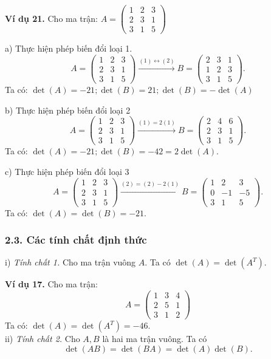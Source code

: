 \textbf{Ví dụ 21.} Cho ma trận: \(A = \begin{pmatrix}
1 & 2 & 3 \\
2 & 3 & 1 \\
3 & 1 & 5
\end{pmatrix} \)

a) Thực hiện phép biến đổi loại 1.
\[
A = \begin{pmatrix}
1 & 2 & 3 \\
2 & 3 & 1 \\
3 & 1 & 5
\end{pmatrix} \xrightarrow{(1) \leftrightarrow (2)} B = \begin{pmatrix}
2 & 3 & 1 \\
1 & 2 & 3 \\
3 & 1 & 5
\end{pmatrix}.
\]
Ta có: \(\det(A) = -21; \det(B) = 21; \det(B) = -\det(A)\)

b) Thực hiện phép biến đổi loại 2
\[
A = \begin{pmatrix}
1 & 2 & 3 \\
2 & 3 & 1 \\
3 & 1 & 5
\end{pmatrix} \xrightarrow{(1)=2(1)} B = \begin{pmatrix}
2 & 4 & 6 \\
2 & 3 & 1 \\
3 & 1 & 5
\end{pmatrix}.
\]
Ta có: \(\det(A) = -21; \det(B) = -42 = 2\det(A)\).

c) Thực hiện phép biến đổi loại 3
\[
A = \begin{pmatrix}
1 & 2 & 3 \\
2 & 3 & 1 \\
3 & 1 & 5
\end{pmatrix} \xrightarrow{(2)=(2)-2(1)} B = \begin{pmatrix}
1 & 2 & 3 \\
0 & -1 & -5 \\
3 & 1 & 5
\end{pmatrix}.
\]
Ta có: \(\det(A) = \det(B) = -21\).
\subsubsection*{2.3. Các tính chất định thức}


i) \textit{Tính chất 1.} Cho ma trận vuông \(A\). Ta có \(\det(A) = \det(A^T)\).

\textbf{Ví dụ 17.} Cho ma trận:
\[
A = \begin{pmatrix}
1 & 3 & 4 \\
2 & 5 & 1 \\
3 & 1 & 2
\end{pmatrix}
\]
Ta có: \(\det(A) = \det(A^T) = -46\).\\
ii) \textit{Tính chất 2.} Cho \(A, B\) là hai ma trận vuông. Ta có
\[
\det(AB) = \det(BA) = \det(A)\det(B).
\]

